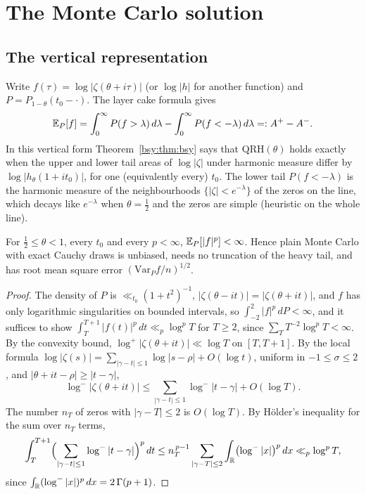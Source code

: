 \section{The Monte Carlo solution}\label{bsy:sec:mc}

\subsection{The vertical representation}

Write $f(\tau)=\log|\zeta(\theta+i\tau)|$ (or $\log|h|$ for another function) and $P=P_{1-\theta}(t_0-\cdot)$. The layer cake formula gives
\[
\mathbb{E}_P[f]=\int_0^\infty P(f>\lambda)\,d\lambda-\int_0^\infty P(f<-\lambda)\,d\lambda=:A^+-A^- .
\]
In this vertical form Theorem~\ref{bsy:thm:bsy} says that $\mathrm{QRH}(\theta)$ holds exactly when the upper and lower tail areas of $\log|\zeta|$ under harmonic measure differ by $\log|h_\theta(1+it_0)|$, for one (equivalently every) $t_0$. The lower tail $P(f<-\lambda)$ is the harmonic measure of the neighbourhoods $\{|\zeta|<e^{-\lambda}\}$ of the zeros on the line, which decays like $e^{-\lambda}$ when $\theta=\frac12$ and the zeros are simple (heuristic on the whole line).

\begin{lemma}\label{bsy:lem:var}
For $\frac12\le\theta<1$, every $t_0$ and every $p<\infty$, $\mathbb{E}_P[|f|^p]<\infty$. Hence plain Monte Carlo with exact Cauchy draws is unbiased, needs no truncation of the heavy tail, and has root mean square error $(\mathrm{Var}_Pf/n)^{1/2}$.
\end{lemma}

\begin{proof}
The density of $P$ is $\ll_{t_0}(1+t^2)^{-1}$, $|\zeta(\theta-it)|=|\zeta(\theta+it)|$, and $f$ has only logarithmic singularities on bounded intervals, so $\int_{-2}^2|f|^p\,dP<\infty$, and it suffices to show $\int_T^{T+1}|f(t)|^p\,dt\ll_p\log^pT$ for $T\ge2$, since $\sum_TT^{-2}\log^pT<\infty$. By the convexity bound, $\log^+|\zeta(\theta+it)|\ll\log T$ on $[T,T+1]$. By the local formula $\log|\zeta(s)|=\sum_{|\gamma-t|\le1}\log|s-\rho|+O(\log t)$, uniform in $-1\le\sigma\le2$ \cite[Chapter IX]{Titchmarsh}, and $|\theta+it-\rho|\ge|t-\gamma|$,
\[
\log^-|\zeta(\theta+it)|\le\sum_{|\gamma-t|\le1}\log^-|t-\gamma|+O(\log T).
\]
The number $n_T$ of zeros with $|\gamma-T|\le2$ is $O(\log T)$. By H\"older's inequality for the sum over $n_T$ terms,
\[
\int_T^{T+1}\Bigl(\sum_{|\gamma-t|\le1}\log^-|t-\gamma|\Bigr)^p\,dt\le n_T^{\,p-1}\sum_{|\gamma-T|\le2}\int_{\mathbb{R}}\bigl(\log^-|x|\bigr)^p\,dx\ll_p\log^pT,
\]
since $\int_{\mathbb{R}}(\log^-|x|)^p\,dx=2\,\Gamma(p+1)$.
\end{proof}

